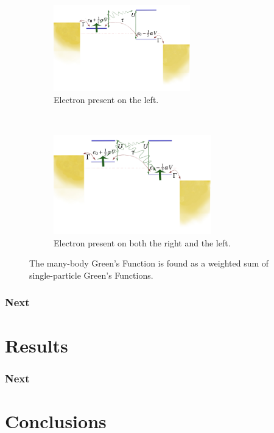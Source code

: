 \begin{frame}
\begin{figure}[!b]
         
        \begin{subfigure}{0.45\textwidth}\centering
            \includegraphics[clip=true,trim=0cm 1cm 0cm 0cm, width=0.65\textwidth]{fig/interacting_schematics2.pdf}
            \caption{Electron present on the left.}
        \end{subfigure}~ 
        \begin{subfigure}{0.45\textwidth}\centering
            \includegraphics[clip=true,trim=0cm 1cm 0cm 0cm, width=0.75\textwidth]{fig/interacting_schematics3.pdf}
            \caption{Electron present on both the right and the left.}
        \end{subfigure}
        \caption{The many-body Green's Function is found as a weighted sum of single-particle Green's Functions.} 
    \end{figure} 
\end{frame}
\begin{frame}
    \frametitle{Next}
\end{frame}
\section{Results}
\begin{frame}
    \frametitle{Next}
\end{frame}
\section{Conclusions}
